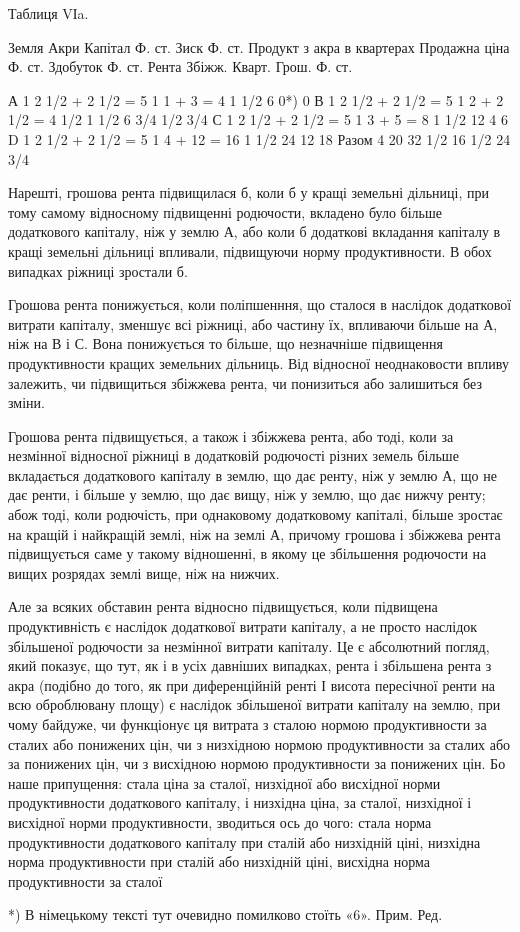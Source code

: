 Таблиця VІa.

Земля
Акри
Капітал Ф. ст.
Зиск Ф. ст.
Продукт з акра в квартерах
Продажна ціна Ф. ст.
Здобуток Ф. ст.
Рента
Збіжж. Кварт.
Грош. Ф. ст.

А    1    2 1/2 + 2 1/2 = 5    1    1 + 3 = 4               1 1/2      6          0*)          0
В    1    2 1/2 + 2 1/2 = 5    1    2 + 2 1/2 = 4 1/2  1 1/2     6 3/4    1/2         3/4
С    1    2 1/2 + 2 1/2 = 5    1    3 + 5 = 8               1 1/2     12         4                6
D    1    2 1/2 + 2 1/2 = 5    1    4 + 12 = 16           1 1/2    24         12            18
Разом    4    20                             32 1/2                      16 1/2
  24 3/4

Нарешті, грошова рента підвищилася б, коли б у кращі земельні дільниці,
при тому самому відносному підвищенні родючости, вкладено було більше
додаткового капіталу, ніж у землю А, або коли б додаткові вкладання капіталу в кращі
земельні дільниці впливали, підвищуючи норму продуктивности. В обох випадках
ріжниці зростали б.

Грошова рента понижується, коли поліпшенння, що сталося в наслідок
додаткової витрати капіталу, зменшує всі ріжниці, або частину їх, впливаючи
більше на А, ніж на В і С. Вона понижується то більше, що незначніше
підвищення продуктивности кращих земельних дільниць. Від відносної неоднаковости
впливу залежить, чи підвищиться збіжжева рента, чи понизиться або
залишиться без зміни.

Грошова рента підвищується, а також і збіжжева рента, або тоді, коли за
незмінної відносної ріжниці в додатковій родючості різних земель більше вкладається
додаткового капіталу в землю, що дає ренту, ніж у землю А, що не дає
ренти, і більше у землю, що дає вищу, ніж у землю, що дає нижчу ренту;
абож тоді, коли родючість, при однаковому додатковому капіталі, більше зростає
на кращій і найкращій землі, ніж на землі А, причому грошова і збіжжева
рента підвищується саме у такому відношенні, в якому це збільшення родючости
на вищих розрядах землі вище, ніж на нижчих.

Але за всяких обставин рента відносно підвищується, коли підвищена продуктивність
є наслідок додаткової витрати капіталу, а не просто наслідок
збільшеної родючости за незмінної витрати капіталу. Це є абсолютний погляд,
який показує, що тут, як і в усіх давніших випадках, рента і збільшена рента з акра
(подібно до того, як при диференційній ренті І висота пересічної ренти на всю
оброблювану площу) є наслідок збільшеної витрати капіталу на землю, при
чому байдуже, чи функціонує ця витрата з сталою нормою продуктивности за
сталих або понижених цін, чи з низхідною нормою продуктивности за сталих або
за понижених цін, чи з висхідною нормою продуктивности за понижених цін.
Бо наше припущення: стала ціна за сталої, низхідної або висхідної норми продуктивности додаткового
капіталу, і низхідна ціна, за сталої, низхідної і висхідної
норми продуктивности, зводиться ось до чого: стала норма продуктивности додаткового капіталу при
сталій або низхідній ціні, низхідна норма продуктивности
при сталій або низхідній ціні, висхідна норма продуктивности за сталої

*) В німецькому тексті тут очевидно помилково стоїть «6». Прим. Ред.
\parbreak{}  %
